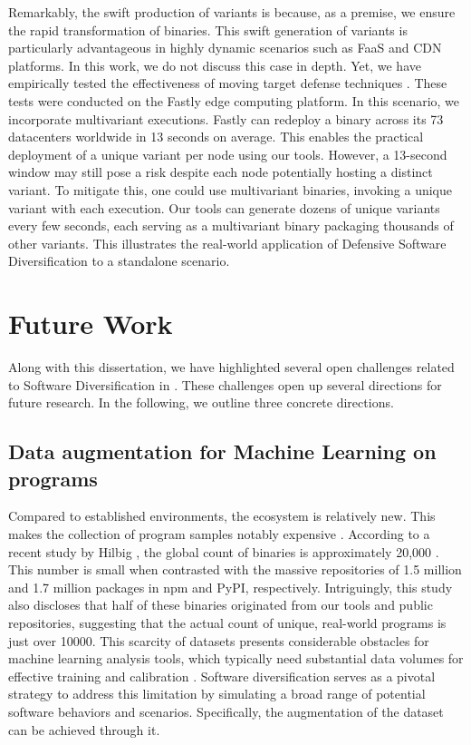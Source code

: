 Remarkably, the swift production of variants is because, as a premise, we ensure the rapid transformation of \Wasm binaries. 
This swift generation of variants is particularly advantageous in highly dynamic scenarios such as FaaS and CDN platforms. 
In this work, we do not discuss this case in depth. 
Yet, we have empirically tested the effectiveness of moving target defense techniques \cite{jackson2011compiler}. 
These tests were conducted on the Fastly edge computing platform.
In this scenario, we incorporate multivariant executions\cite{MEWE}. 
Fastly can redeploy a \Wasm binary across its 73 datacenters worldwide in 13 seconds on average. 
This enables the practical deployment of a unique variant per node using our tools. 
However, a 13-second window may still pose a risk despite each node potentially hosting a distinct \Wasm variant. 
To mitigate this, one could use multivariant binaries, invoking a unique variant with each execution. 
Our tools can generate dozens of unique variants every few seconds, each serving as a multivariant binary packaging thousands of other variants. 
This illustrates the real-world application of Defensive Software Diversification to a \Wasm standalone scenario.


\section{Future Work}

Along with this dissertation, we have highlighted several open challenges related to Software Diversification in \Wasm.
These challenges open up several directions for future research.
In the following, we outline three concrete directions.


\vspace{-0.3cm}
\subsection{Data augmentation for Machine Learning on \Wasm programs}
Compared to established environments, the \Wasm ecosystem is relatively new. This makes the collection of \Wasm program samples notably expensive \cite{Hilbig2021AnES, 10174194}.
According to a recent study by Hilbig \etal, the global count of \Wasm binaries is approximately 20,000  \cite{Hilbig2021AnES}. 
This number is small when contrasted with the massive repositories of 1.5 million and 1.7 million packages in npm and PyPI, respectively. 
Intriguingly, this study also discloses that half of these \Wasm binaries originated from our tools and public repositories, suggesting that the actual count of unique, real-world \Wasm programs is just over 10000.
This scarcity of \Wasm datasets presents considerable obstacles for machine learning analysis tools, which typically need substantial data volumes for effective training and calibration \cite{2023arXiv230519915Z}.
Software diversification serves as a pivotal strategy to address this limitation by simulating a broad range of potential software behaviors and scenarios. 
Specifically, the augmentation of the \Wasm dataset can be achieved through it.

